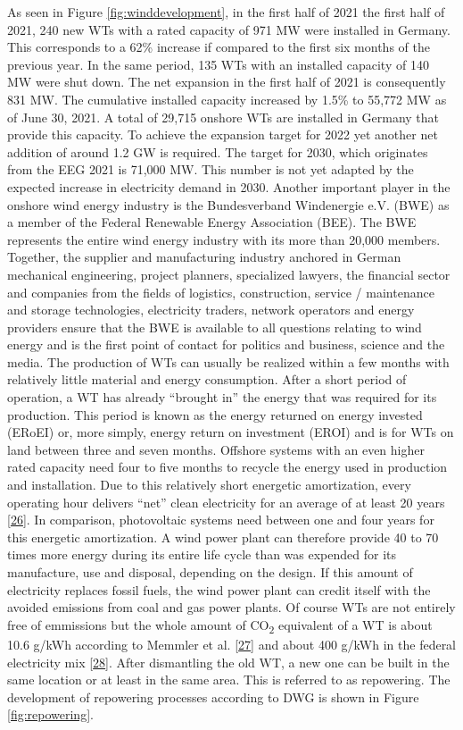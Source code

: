 \documentclass[a4paper,11pt]{article}
\begin{document}
As seen in Figure \ref{fig:winddevelopment}, in the first half of 2021 the first half of 2021, 240 new WTs with a rated capacity of 971 MW were installed in Germany. This corresponds to a 62\% increase if compared to the first six months of the previous year. In the same period, 135 WTs with an installed capacity of 140 MW were shut down. The net expansion in the first half of 2021 is consequently 831 MW. The cumulative installed capacity increased by 1.5\% to 55,772 MW as of June 30, 2021. A total of 29,715 onshore WTs are installed in Germany that provide this capacity. To achieve the expansion target for 2022 yet another net addition of around 1.2 GW is required. The target for 2030, which originates from the EEG 2021 is 71,000 MW. This number is not yet adapted by the expected increase in electricity demand in 2030. Another important player in the onshore wind energy industry is the Bundesverband Windenergie e.V. (BWE) as a member of the Federal Renewable Energy Association (BEE). The BWE represents the entire wind energy industry with its more than 20,000 members. Together, the supplier and manufacturing industry anchored in German mechanical engineering, project planners, specialized lawyers, the financial sector and companies from the fields of logistics, construction, service / maintenance and storage technologies, electricity traders, network operators and energy providers ensure that the BWE is available to all questions relating to wind energy and is the first point of contact for politics and business, science and the media. The production of WTs can usually be realized within a few months with relatively little material and energy consumption. After a short period of operation, a WT has already ``brought in'' the energy that was required for its production. This period is known as the energy returned on energy invested (ERoEI) or, more simply, energy return on investment (EROI) and is for WTs on land between three and seven months. Offshore systems with an even higher rated capacity need four to five months to recycle the energy used in production and installation. Due to this relatively short energetic amortization, every operating hour delivers ``net'' clean electricity for an average of at least 20 years {[}\protect\hyperlink{ref-PriyanaRazdan.2019}{26}{]}. In comparison, photovoltaic systems need between one and four years for this energetic amortization. A wind power plant can therefore provide 40 to 70 times more energy during its entire life cycle than was expended for its manufacture, use and disposal, depending on the design. If this amount of electricity replaces fossil fuels, the wind power plant can credit itself with the avoided emissions from coal and gas power plants. Of course WTs are not entirely free of emmissions but the whole amount of CO\textsubscript{2} equivalent of a WT is about 10.6 g/kWh according to Memmler et al. {[}\protect\hyperlink{ref-M.MemmlerDr.T.LaufS.Schneider.2017}{27}{]} and about 400 g/kWh in the federal electricity mix {[}\protect\hyperlink{ref-Umweltbundesamt.2021}{28}{]}. After dismantling the old WT, a new one can be built in the same location or at least in the same area. This is referred to as repowering. The development of repowering processes according to DWG is shown in Figure \ref{fig:repowering}.
\end{document}
